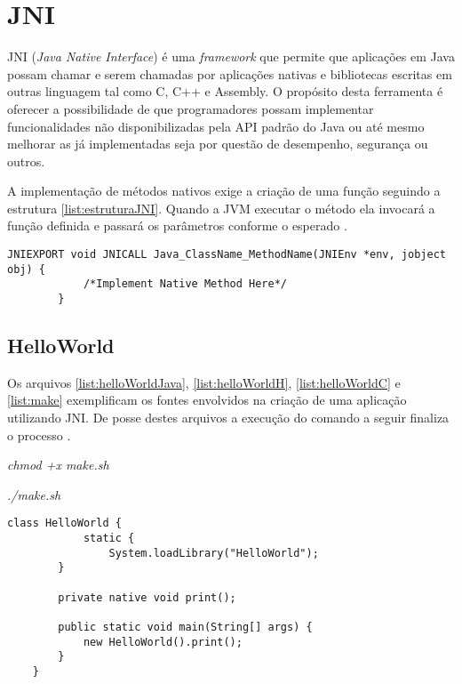 \chapter{JNI}
\label{apend:jni}

JNI (\textit{Java Native Interface}) é uma \textit{framework} que permite que
aplicações em Java possam chamar e serem chamadas por aplicações nativas e
bibliotecas escritas em outras linguagem tal como C, C++ e Assembly.
O propósito desta ferramenta é oferecer a possibilidade de que programadores
possam implementar funcionalidades não disponibilizadas pela API padrão do Java
ou até mesmo melhorar as já implementadas seja por questão de desempenho,
segurança ou outros.

A implementação de métodos nativos exige a criação de uma função seguindo a estrutura
\ref{list:estruturaJNI}. Quando a JVM executar o método ela invocará a função
definida e passará os parâmetros conforme o esperado \cite{jniDoc}. 

	\begin{lstlisting}[caption=HelloWorld.java., label=list:estruturaJNI]	
		JNIEXPORT void JNICALL Java_ClassName_MethodName(JNIEnv *env, jobject obj) {
			/*Implement Native Method Here*/
		}
	\end{lstlisting}
	
\section{HelloWorld}

	Os arquivos \ref{list:helloWorldJava}, \ref{list:helloWorldH},
	\ref{list:helloWorldC} e \ref{list:make} exemplificam os fontes envolvidos na criação de uma aplicação utilizando JNI. De posse destes arquivos a execução do comando a seguir finaliza o processo \cite{jniDoc}.

	
	\textit{chmod +x make.sh}
	
	\textit{./make.sh}


	\begin{lstlisting}[caption=HelloWorld.java., label=list:helloWorldJava]
	class HelloWorld {
			static {
				System.loadLibrary("HelloWorld");
	    }
	    
	    private native void print();
	        
	    public static void main(String[] args) {
	    	new HelloWorld().print();
	    }   
	}
	\end{lstlisting}
	
